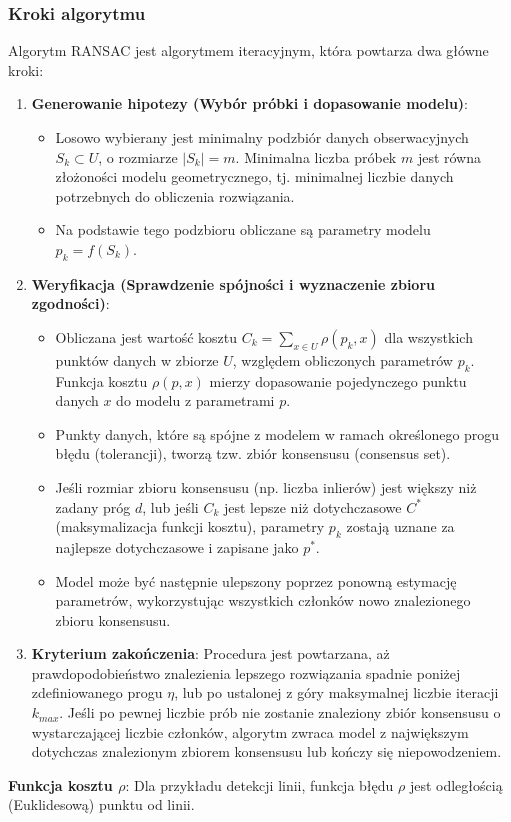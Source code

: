 \documentclass[12pt]{article}
\begin{document}
\subsubsection{Kroki algorytmu}
Algorytm RANSAC jest algorytmem iteracyjnym, która powtarza dwa główne kroki:
\begin{enumerate}
    \item \textbf{Generowanie hipotezy (Wybór próbki i dopasowanie modelu)}:
    \begin{itemize}
        \item Losowo wybierany jest minimalny podzbiór danych obserwacyjnych $S_k \subset U$, o rozmiarze $|S_k| = m$. Minimalna liczba próbek $m$ jest równa złożoności modelu geometrycznego, tj. minimalnej liczbie danych potrzebnych do obliczenia rozwiązania.
        \item Na podstawie tego podzbioru obliczane są parametry modelu $p_k = f(S_k)$.
    \end{itemize}
    \item \textbf{Weryfikacja (Sprawdzenie spójności i wyznaczenie zbioru zgodności)}:
    \begin{itemize}
        \item Obliczana jest wartość kosztu $C_k = \sum_{x \in U} \rho(p_k, x)$ dla wszystkich punktów danych w zbiorze $U$, względem obliczonych parametrów $p_k$. Funkcja kosztu $\rho(p, x)$ mierzy dopasowanie pojedynczego punktu danych $x$ do modelu z parametrami $p$.
        \item Punkty danych, które są spójne z modelem w ramach określonego progu błędu (tolerancji), tworzą tzw. zbiór konsensusu (consensus set).
        \item Jeśli rozmiar zbioru konsensusu (np. liczba inlierów) jest większy niż zadany próg $d$, lub jeśli $C_k$ jest lepsze niż dotychczasowe $C^*$ (maksymalizacja funkcji kosztu), parametry $p_k$ zostają uznane za najlepsze dotychczasowe i zapisane jako $p^*$.
        \item Model może być następnie ulepszony poprzez ponowną estymację parametrów, wykorzystując wszystkich członków nowo znalezionego zbioru konsensusu.
    \end{itemize}
    \item \textbf{Kryterium zakończenia}:
    Procedura jest powtarzana, aż prawdopodobieństwo znalezienia lepszego rozwiązania spadnie poniżej zdefiniowanego progu $\eta$, lub po ustalonej z góry maksymalnej liczbie iteracji $k_{max}$. Jeśli po pewnej liczbie prób nie zostanie znaleziony zbiór konsensusu o wystarczającej liczbie członków, algorytm zwraca model z największym dotychczas znalezionym zbiorem konsensusu lub kończy się niepowodzeniem.
\end{enumerate}
\textbf{Funkcja kosztu $\rho$}: Dla przykładu detekcji linii, funkcja błędu $\rho$ jest odległością (Euklidesową) punktu od linii.
\end{document}
